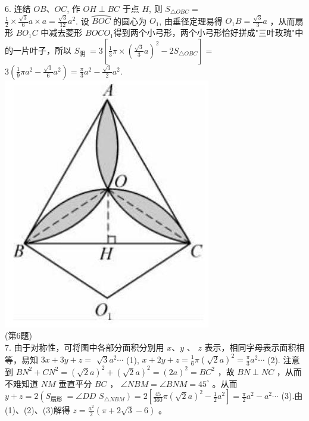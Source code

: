 \documentclass[10pt]{article}
\begin{document}
6. 连结 $O B 、 O C$, 作 $O H \perp B C$ 于点 $H$, 则 $S_{\triangle O B C}=$\\
$\frac{1}{2} \times \frac{\sqrt{3}}{6} a \times a=\frac{\sqrt{3}}{12} a^{2}$. 设 $\overparen{B O C}$ 的圆心为 $O_{1}$, 由垂径定理易得 $O_{1} B=\frac{\sqrt{3}}{3} a$ ，从而扇形 $B O_{1} C$ 中减去菱形 $B O C O_{1}$得到两个小弓形，两个小弓形恰好拼成"三叶玫瑰"中的一片叶子，所以 $S_{\text {阴 }}=3\left[\frac{1}{3} \pi \times\left(\frac{\sqrt{3}}{3} a\right)^{2}-2 S_{\triangle O B C}\right]=$ $3\left(\frac{1}{9} \pi a^{2}-\frac{\sqrt{3}}{6} a^{2}\right)=\frac{\pi}{3} a^{2}-\frac{\sqrt{3}}{2} a^{2}$.\\
\includegraphics[max width=\textwidth, center]{2024_10_30_66b8e5e701da2093c133g-086(2)}\\
(第6题)\\
7. 由于对称性，可将图中各部分面积分别用 $x 、 y$ 、 $z$ 表示，相同字母表示面积相等，易知 $3 x+3 y+z=$ $\sqrt{3} a^{2} \cdots$ (1), $x+2 y+z=\frac{1}{6} \pi(\sqrt{2} a)^{2}=\frac{\pi}{3} a^{2} \cdots$ (2). 注意到 $B N^{2}+C N^{2}=(\sqrt{2} a)^{2}+(\sqrt{2} a)^{2}=(2 a)^{2}=B C^{2}$ ，故 $B N \perp N C$ ，从而不难知道 $N M$ 垂直平分 $B C$ ， $\angle N B M=\angle B N M=45^{\circ}$ 。从而 $y+z=2\left(S_{\text {扇形 }}=\angle D D\right.$ $\left.S_{\triangle N B M}\right)=2\left[\frac{45}{360} \pi(\sqrt{2} a)^{2}-\frac{1}{2} a^{2}\right]=\frac{\pi}{2} a^{2}-a^{2} \cdots$ (3).由(1)、(2)、(3)解得 $z=\frac{a^{2}}{2}(\pi+2 \sqrt{3}-6)$ 。\\
\end{document}
